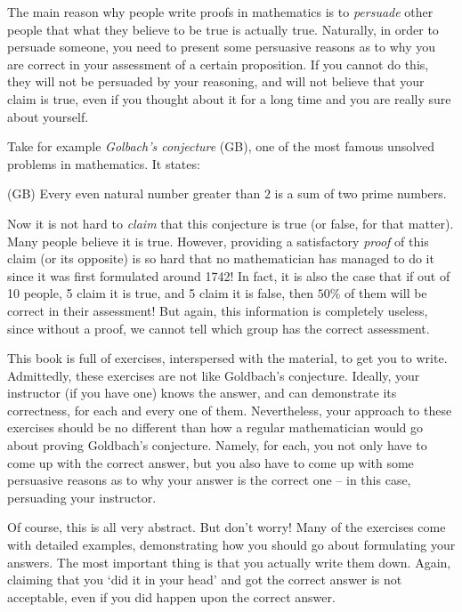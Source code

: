 The main reason why people write proofs in mathematics is to \textit{persuade} other people that what they believe to be true is actually true. Naturally, in order to persuade someone, you need to present some persuasive reasons as to why you are correct in your assessment of a certain proposition. If you cannot do this, they will not be persuaded by your reasoning, and will not believe that your claim is true, even if you thought about it for a long time and you are really sure about yourself. 

Take for example \textit{Golbach's conjecture} (GB), one of the most famous unsolved problems in mathematics. It states: 

\begin{center}
(GB) Every even natural number greater than $2$ is a sum of two prime numbers. 
\end{center}

Now it is not hard to \textit{claim} that this conjecture is true (or false, for that matter). Many people believe it is true. However, providing a satisfactory \textit{proof} of this claim (or its opposite) is so hard that no mathematician has managed to do it since it was first formulated around 1742! In fact, it is also the case that if out of 10 people, 5 claim it is true, and 5 claim it is false, then $50\%$ of them will be correct in their assessment! But again, this information is completely useless, since without a proof, we cannot tell which group has the correct assessment.

This book is full of exercises, interspersed with the material, to get you to write. Admittedly, these exercises are not like Goldbach's conjecture. Ideally, your instructor (if you have one) knows the answer, and can demonstrate its correctness, for each and every one of them. Nevertheless, your approach to these exercises should be no different than how a regular mathematician would go about proving Goldbach's conjecture. Namely, for each, you not only have to come up with the correct answer, but you also have to come up with some persuasive reasons as to why your answer is the correct one -- in this case, persuading your instructor. 

Of course, this is all very abstract. But don't worry! Many of the exercises come with detailed examples, demonstrating how you should go about formulating your answers. The most important thing is that you actually write them down. Again, claiming that you `did it in your head' and got the correct answer is not acceptable, even if you did happen upon the correct answer. 

